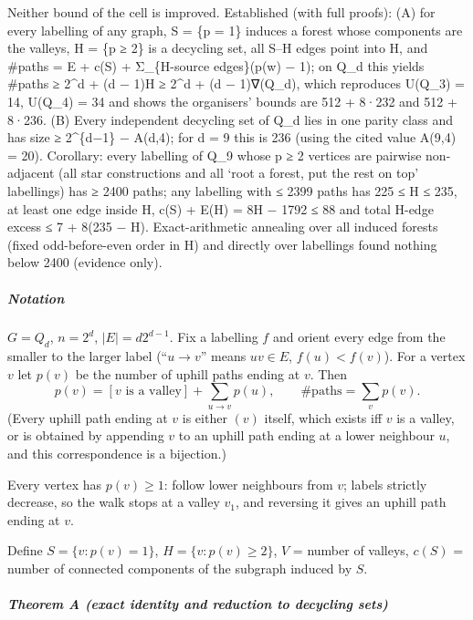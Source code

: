 
Neither bound of the cell is improved. Established (with full proofs):
(A) for every labelling of any graph, S = \{p = 1\} induces a forest
whose components are the valleys, H = \{p ≥ 2\} is a decycling set, all
S--H edges point into H, and \#paths = \textbar E\textbar{} + c(S) +
Σ\_\{H-source edges\}(p(w) − 1); on Q\_d this yields \#paths ≥ 2\^{}d +
(d − 1)\textbar H\textbar{} ≥ 2\^{}d + (d − 1)∇(Q\_d), which reproduces
U(Q\_3) = 14, U(Q\_4) = 34 and shows the organisers' bounds are 512 +
8·232 and 512 + 8·236. (B) Every independent decycling set of Q\_d lies
in one parity class and has size ≥ 2\^{}\{d−1\} − A(d,4); for d = 9 this
is 236 (using the cited value A(9,4) = 20). Corollary: every labelling
of Q\_9 whose p ≥ 2 vertices are pairwise non-adjacent (all star
constructions and all `root a forest, put the rest on top' labellings)
has ≥ 2400 paths; any labelling with ≤ 2399 paths has 225 ≤
\textbar H\textbar{} ≤ 235, at least one edge inside H, c(S) +
\textbar E(H)\textbar{} = 8\textbar H\textbar{} − 1792 ≤ 88 and total
H-edge excess ≤ 7 + 8(235 − \textbar H\textbar). Exact-arithmetic
annealing over all induced forests (fixed odd-before-even order in H)
and directly over labellings found nothing below 2400 (evidence only).


\subparagraph{Notation}\label{notation}

\(G=Q_d\), \(n=2^d\), \(|E|=d2^{d-1}\). Fix a labelling \(f\) and orient
every edge from the smaller to the larger label (``\(u\to v\)'' means
\(uv\in E\), \(f(u)<f(v)\)). For a vertex \(v\) let \(p(v)\) be the
number of uphill paths ending at \(v\). Then
\[p(v)=[v\text{ is a valley}]+\sum_{u\to v}p(u),\qquad \#\text{paths}=\sum_v p(v). \tag{0}\]
(Every uphill path ending at \(v\) is either \((v)\) itself, which
exists iff \(v\) is a valley, or is obtained by appending \(v\) to an
uphill path ending at a lower neighbour \(u\), and this correspondence
is a bijection.)

Every vertex has \(p(v)\ge 1\): follow lower neighbours from \(v\);
labels strictly decrease, so the walk stops at a valley \(v_1\), and
reversing it gives an uphill path ending at \(v\).

Define \(S=\{v:p(v)=1\}\), \(H=\{v:p(v)\ge 2\}\), \(V\) = number of
valleys, \(c(S)\) = number of connected components of the subgraph
induced by \(S\).

\subparagraph{Theorem A (exact identity and reduction to decycling
sets)}\label{theorem-a-exact-identity-and-reduction-to-decycling-sets}

